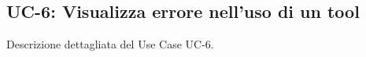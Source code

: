 \subsection{UC-6: Visualizza errore nell'uso di un tool}

Descrizione dettagliata del Use Case UC-6.
